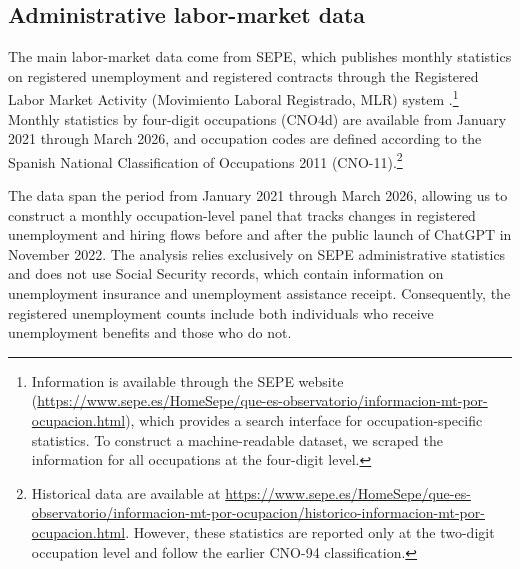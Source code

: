 \documentclass[11pt]{article}
\begin{document}
\subsection{Administrative labor-market data}

The main labor-market data come from SEPE, which publishes monthly statistics on registered unemployment and registered contracts through the Registered Labor Market Activity (Movimiento Laboral Registrado, MLR) system \citep{sepe_stats}.\footnote{Information is available through the SEPE website (\url{https://www.sepe.es/HomeSepe/que-es-observatorio/informacion-mt-por-ocupacion.html}), which provides a search interface for occupation-specific statistics. To construct a machine-readable dataset, we scraped the information for all occupations at the four-digit level.} Monthly statistics by four-digit occupations (CNO4d) are available from January 2021 through March 2026, and occupation codes are defined according to the Spanish National Classification of Occupations 2011 (CNO-11).\footnote{Historical data are available at \url{https://www.sepe.es/HomeSepe/que-es-observatorio/informacion-mt-por-ocupacion/historico-informacion-mt-por-ocupacion.html}. However, these statistics are reported only at the two-digit occupation level and follow the earlier CNO-94 classification.} %

The data span the period from January 2021 through March 2026, allowing us to construct a monthly occupation-level panel that tracks changes in registered unemployment and hiring flows before and after the public launch of ChatGPT in November 2022. The analysis relies exclusively on SEPE administrative statistics and does not use Social Security records, which contain information on unemployment insurance and unemployment assistance receipt. Consequently, the registered unemployment counts include both individuals who receive unemployment benefits and those who do not.
\end{document}
